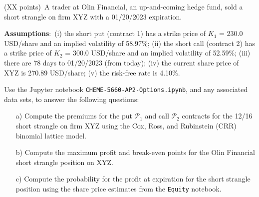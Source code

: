\item{(XX points)~A trader at Olin Financial, an up-and-coming hedge fund, sold a short strangle on firm XYZ with a 01/20/2023 expiration. 

\textbf{Assumptions}:~(i) the short put (contract 1) has a strike price of $K_{1}$ = 230.0 USD/share and an implied volatility of 58.97\%;
(ii) the short call (contract 2) has a strike price of $K_{2}$ = 300.0 USD/share and an implied volatility of 52.59\%;
(iii) there are 78 days to 01/20/2023 (from today); (iv) the current share price of XYZ is 270.89 USD/share; (v) the risk-free rate is 4.10\%.

Use the Jupyter notebook \texttt{CHEME-5660-AP2-Options.ipynb}, and any associated data sets, to answer the following questions:

\begin{itemize}
    \item[a)]{Compute the premiums for the put $\mathcal{P}_{1}$ and call $\mathcal{P}_{2}$ contracts for the 12/16 short strangle on firm XYZ using
    the Cox, Ross, and Rubinstein (CRR) binomial lattice model. }
    \item[b)]{Compute the maximum profit and break-even points for the Olin Financial short strangle position on XYZ.}
    \item[c)]{Compute the probability for the profit at expiration for the short strangle position using the share price estimates from the \texttt{Equity} notebook. }
\end{itemize}
}